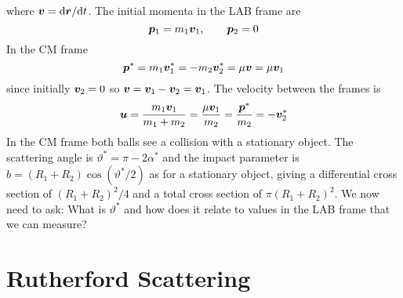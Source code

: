 \documentclass{article}
\begin{document}
    where \(\bm{v} = \dd \bm{r}/\dd t\).
    The initial momenta in the LAB frame are 
    \[\bm{p}_1 = m_1\bm{v}_1,\qquad \bm{p}_2 = 0\]
    In the CM frame
    \[\bm{p}^* = m_1\bm{v}_1^* = -m_2\bm{v}_2^* = \mu\bm{v} = \mu\bm{v}_1\]
    since initially \(\bm{v}_2 = 0\) so \(\bm{v} = \bm{v}_1 - \bm{v}_2 = \bm{v}_1\).
    The velocity between the frames is
    \[\bm{u} = \frac{m_1\bm{v}_1}{m_1 + m_2} = \frac{\mu\bm{v}_1}{m_2} = \frac{\bm{p}^*}{m_2} = -\bm{v}_2^*\]
    In the CM frame both balls see a collision with a stationary object.
    The scattering angle is \(\vartheta^* = \pi - 2\alpha^*\) and the impact parameter is \(b = (R_1 + R_2)\cos(\vartheta^*/2)\) as for a stationary object, giving a differential cross section of \((R_1 + R_2)^2/4\) and a total cross section of \(\pi(R_1 + R_2)^2\).
    We now need to ask: What is \(\vartheta^*\) and how does it relate to values in the LAB frame that we can measure?
    
    \section{Rutherford Scattering}
\end{document}
